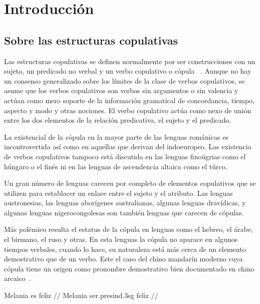 \chapter{Introducción}
\vspace*{-.25in}
\section{Sobre las estructuras copulativas}
Las estructuras copulativas se definen normalmente por ser construcciones con un sujeto, un predicado no verbal y un verbo copulativo o cópula ~\autocite{Bentley20179Copular-and-}. Aunque no hay un consenso generalizado sobre los límites de la clase de verbos copulativos, se asume que los verbos copulativos son verbos sin argumentos o sin valencia y actúan como mero soporte de la información gramatical de concordancia, tiempo, aspecto y modo y otras nociones. El verbo copulativo actúa como nexo de unión entre los dos elementos de la relación predicativa, el sujeto y el predicado.

La existencial de la cópula en la mayor parte de las lenguas románicas es incontrovertida así como en aquellas que derivan del indoeuropeo. Las existencia de verbos copulativos tampoco está discutida en las lenguas finoúgrias como el húngaro o el finés ni en las lenguas de ascendencia altaica como el túrco. 

Un gran número de lenguas carecen por completo de elementos copulativos que se utilizen para establacer un enlace entre el sujeto y el atributo. Las lenguas austronesias, las lenguas aborígenes australianas, algunas lenguas dravídicas, y algunas lenguas nigerocongolesas son también lenguas que carecen de cópulas.

Más polémico resulta el estatus de la cópula en lenguas como el hebreo, el árabe, el birmano, el ruso y otras. En esta lenguas la cópula no aparace en algunos tiempos verbales, cuando lo hace, su naturaleza está más cerca de un elemento demostrativo que de un verbo. Este el caso del chino mandarín moderno cuya cópula tiene un origen como pronombre demostrativo bien documentado en chino arcaico~. 





\ex[glspace=!1em,everygla={},everyglb={},aboveglbskip=-.2ex]
\begingl
\gla Melania es feliz //
\glb Melania ser.{\sc presind}.{\sc 3sg} feliz  //
\endgl
\xe


